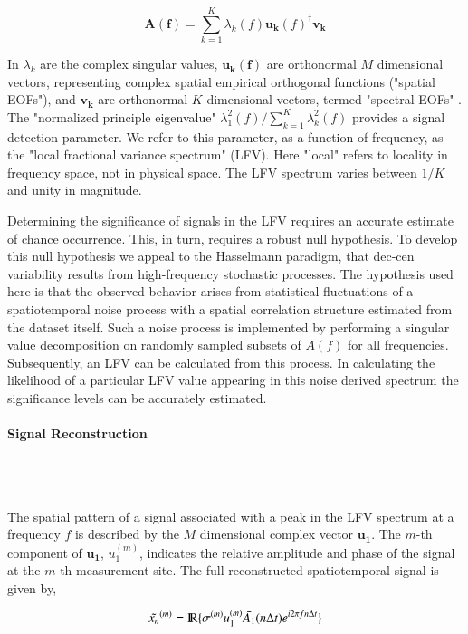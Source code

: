 \documentclass[phd,tocprelim]{cornell}
\newcommand{\myparagraph}[1]{\paragraph{#1}\mbox{}\\\mbox{}\\}
\begin{document}
\begin{equation}
    \mathbf{A(f)}=\sum_{k=1}^{K} \lambda_{k}(f) \mathbf{u_{k}}(f)^{\dagger}\mathbf{v_{k}}
\label{svd:eqn}    
\end{equation}

In  $\lambda_{k}$ are the complex singular values, 
$\mathbf{u_{k}(f)}$ are orthonormal $M$ dimensional vectors, representing complex spatial 
empirical orthogonal functions ("spatial EOFs"), and $\mathbf{v_{k}}$ are 
orthonormal $K$ dimensional vectors, termed "spectral EOFs" 
\cite{mann1999oscillatory,mann1994global}. The "normalized principle 
eigenvalue" $\lambda_{1}^{2}(f)/{\sum_{k=1}^{K} \lambda_{k}^{2}(f)}$ 
provides a signal detection parameter. We refer to this parameter, 
as a function of frequency, as the "local fractional variance 
spectrum" (LFV). Here "local" refers to locality in frequency space, 
not in physical space. The LFV spectrum varies between 
$1/K$ and unity in magnitude. 
\par
Determining the significance of signals in the LFV requires an accurate 
estimate of chance occurrence. This, in turn, requires a robust null hypothesis. 
To develop this null hypothesis we appeal to the Hasselmann paradigm, that dec-cen 
variability results from high-frequency stochastic processes. 
The hypothesis used here is that the observed behavior arises from statistical 
fluctuations of a spatiotemporal noise process with a spatial correlation 
structure estimated from the dataset itself. Such a noise process is 
implemented by performing a singular value decomposition on randomly sampled 
subsets of $A(f)$ for all frequencies. Subsequently, an LFV can be calculated 
from this process. In calculating the likelihood of a particular LFV value 
appearing in this noise derived spectrum the significance levels can be 
accurately estimated. 

\myparagraph{Signal Reconstruction}\label{sig:con}

The spatial pattern of a signal associated with a peak in the LFV 
spectrum at a frequency $f$ is described by the $M$ dimensional complex 
vector $\mathbf{u_1}$. The $m$-th component of $\mathbf{u_1}$, $u_1^{(m)}$, 
indicates the relative amplitude and phase of the signal at the $m$-th 
measurement site. The full reconstructed spatiotemporal signal is given by,

\begin{equation}
\tilde{x_{n}}^{(m)}={\rm I\!R}\{\sigma^{(m)}u_{1}^{(m)}\bar{A_1}(n \Delta t)e^{i2\pi f n \Delta t}\}
\end{equation}
\end{document}
